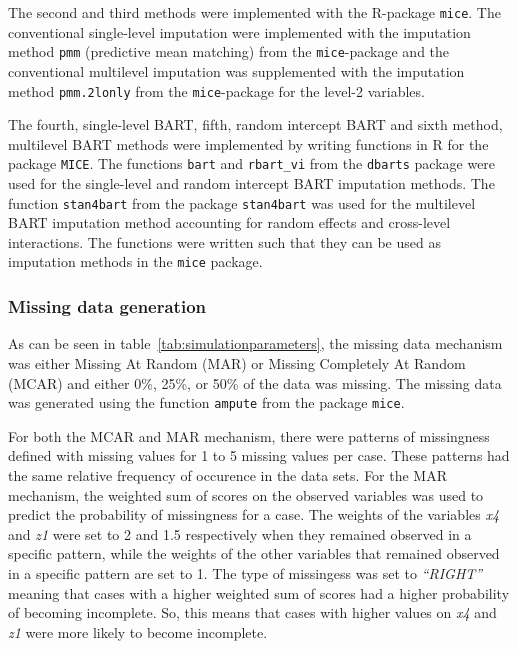 \documentclass[10pt, a4paper, titlepage]{article}
\begin{document}
The second and third methods were implemented with the R-package \texttt{mice}. The conventional single-level imputation were implemented with the imputation method \texttt{pmm} (predictive mean matching) from the \texttt{mice}-package and the conventional multilevel imputation was supplemented with the imputation method \texttt{pmm.2lonly} from the \texttt{mice}-package for the level-2 variables. 

The fourth, single-level BART, fifth, random intercept BART and sixth method, multilevel BART methods were implemented by writing functions in R \citep{rcoreteam2023} for the package \texttt{MICE}. The functions \texttt{bart} and \texttt{rbart\_vi} from the \texttt{dbarts} package were used for the single-level and random intercept BART imputation methods. The function \texttt{stan4bart} from the package \texttt{stan4bart} was used for the multilevel BART imputation method accounting for random effects and cross-level interactions. The functions were written such that they can be used as imputation methods in the \texttt{mice} package.

\subsubsection{Missing data generation}
As can be seen in table~\ref{tab:simulationparameters}, the missing data mechanism was either Missing At Random (MAR) or Missing Completely At Random (MCAR) and either 0\%, 25\%, or 50\% of the data was missing. The missing data was generated using the function \texttt{ampute} from the package \texttt{mice}.

For both the MCAR and MAR mechanism, there were patterns of missingness defined with missing values for 1 to 5 missing values per case. These patterns had the same relative frequency of occurence in the data sets. For the MAR mechanism, the weighted sum of scores on the observed variables was used to predict the probability of missingness for a case. The weights of the variables \textit{x4} and \textit{z1} were set to 2 and 1.5 respectively when they remained observed in a specific pattern, while the weights of the other variables that remained observed in a specific pattern are set to 1. The type of missingess was set to \textit{``RIGHT''} meaning that cases with a higher weighted sum of scores had a higher probability of becoming incomplete. So, this means that cases with higher values on \textit{x4} and \textit{z1} were more likely to become incomplete.
\end{document}
